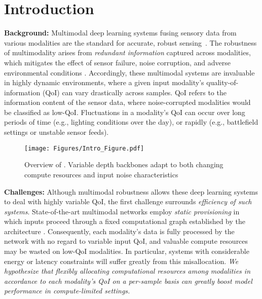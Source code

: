 



\section{Introduction}
\textbf{Background:} Multimodal deep learning systems fusing sensory data from various modalities are the standard for accurate, robust sensing~\cite{chen2022multimodal, eitel2015robustness}. The robustness of multimodality arises from \emph{redundant information} captured across modalities, which mitigates the effect of sensor failure, noise corruption, and adverse environmental conditions \cite{lin2023missmodal, liu2022emotion}. Accordingly, these multimodal systems are invaluable in highly dynamic environments, where a given input modality's quality-of-information (QoI) can vary drastically across samples. QoI refers to the information content of the sensor data, where noise-corrupted modalities would be classified as low-QoI. Fluctuations in a modality's QoI can occur over long periods of time (e.g., lighting conditions over the day), or rapidly (e.g., battlefield settings or unstable sensor feeds). 


\begin{figure}
    \centering
    \texttt{[image: Figures/Intro\_Figure.pdf]}
        \vspace{-0.15in}
    \caption{Overview of \name. Variable depth backbones adapt to both changing compute resources and input noise characteristics}
    \vspace{-0.15in}
    \label{fig:intro_figure}
\end{figure}


\textbf{Challenges:}
Although multimodal robustness allows these deep learning systems to deal with highly variable QoI, the first challenge surrounds \emph{efficiency of such systems}. State-of-the-art multimodal networks employ \emph{static provisioning} in which inputs proceed through a fixed computational graph established by the architecture \cite{wang2024multimodal, yin2024fusion}. Consequently, each modality's data is fully processed by the network with no regard to variable input QoI, and valuable compute resources may be wasted on low-QoI modalities. In particular, systems with considerable energy or latency constraints will suffer greatly from this misallocation. \emph{We hypothesize that flexibly allocating computational resources among modalities in accordance to each modality's QoI on a per-sample basis can greatly boost model performance in compute-limited settings.} 


